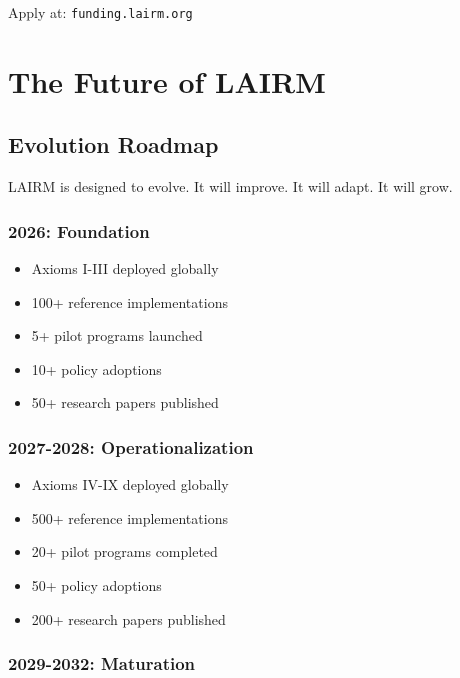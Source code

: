 \documentclass[12pt,a4paper,twoside,openright]{book}
\begin{document}
Apply at: \texttt{funding.lairm.org}

\cleardoublepage

\chapter{The Future of LAIRM}
\label{ch:future}

\section{Evolution Roadmap}

LAIRM is designed to evolve. It will improve. It will adapt. It will grow.

\subsection{2026: Foundation}

\begin{itemize}
    \item Axioms I-III deployed globally
    \item 100+ reference implementations
    \item 5+ pilot programs launched
    \item 10+ policy adoptions
    \item 50+ research papers published
\end{itemize}

\subsection{2027-2028: Operationalization}

\begin{itemize}
    \item Axioms IV-IX deployed globally
    \item 500+ reference implementations
    \item 20+ pilot programs completed
    \item 50+ policy adoptions
    \item 200+ research papers published
\end{itemize}

\subsection{2029-2032: Maturation}
\end{document}
